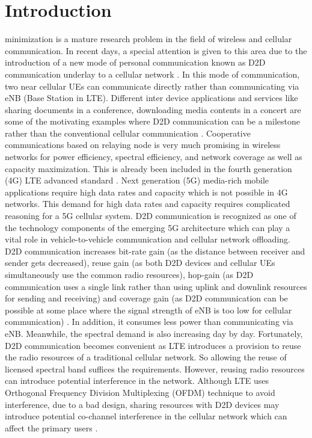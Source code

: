 \documentclass{ieeeaccess}
\begin{document}
\section{Introduction}
\label{sec:introduction}
 minimization is a mature research problem in the field of wireless and cellular communication. In recent days, a special attention is given to this area due to the introduction of a new mode of personal communication known as D2D communication underlay to a cellular network \cite{lte}. In this mode of communication, two near cellular UEs can communicate directly rather than communicating via eNB (Base Station in LTE). Different inter device applications and services like sharing documents in a conference, downloading media contents in a concert are some of the motivating examples where D2D communication can be a milestone rather than the conventional cellular communication \cite{doppler2009device}. Cooperative communications based on relaying node is very much promising in wireless networks for  power efficiency, spectral efficiency, and network coverage as well as capacity maximization. This is already been included in the fourth generation (4G) LTE advanced standard \cite{5g}. Next generation (5G) media-rich mobile applications require high data rates and capacity which is not possible in 4G networks. This demand for high data rates and capacity requires complicated reasoning for a 5G cellular system. D2D communication is recognized as one of the technology components of the emerging 5G architecture which can play a vital role in vehicle-to-vehicle communication and cellular network offloading. D2D communication increases bit-rate gain (as the distance between receiver and sender gets decreased), reuse gain (as both D2D devices and cellular UEs simultaneously use the common radio resources), hop-gain (as D2D communication uses a single link rather than using uplink and downlink resources for sending and receiving) and coverage gain (as D2D communication can be possible at some place where the signal strength of eNB is too low for cellular communication) \cite{fodor}. In addition, it consumes less power than communicating via eNB\cite{stefania}. Meanwhile, the spectral demand is also increasing day by day. Fortunately, D2D communication becomes convenient as LTE  introduces a provision to reuse the radio resources of a traditional cellular network. So allowing the reuse of licensed spectral band suffices the requirements. However, reusing radio resources can introduce potential interference in the network. Although LTE uses  Orthogonal Frequency Division Multiplexing (OFDM) technique to avoid interference, due to a bad design, sharing resources with D2D devices may introduce potential co-channel interference in the cellular network which can affect the primary users \cite{asadi2014survey, min}. 
\end{document}
